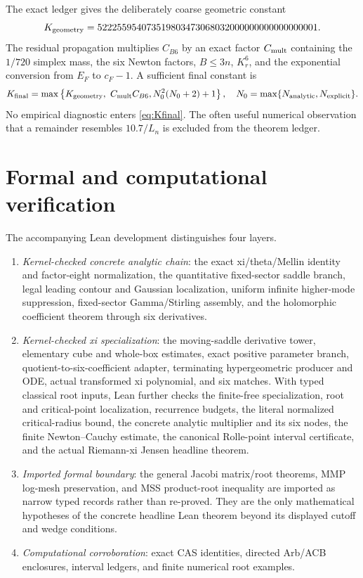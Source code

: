 \documentclass[12pt]{article}
\begin{document}
The exact ledger gives the deliberately coarse geometric constant
\begin{equation}\label{eq:Kgeometry}
 K_{\rm geometry}=
 522255954073519803473068032000000000000000001.
\end{equation}
The residual propagation multiplies $C_{B6}$ by an exact factor
$C_{\rm mult}$ containing the $1/720$ simplex mass, the six Newton factors,
$B\le3n$, $K_r^6$, and the exponential conversion from $E_F$ to $c_F-1$.
A sufficient final constant is
\begin{equation}\label{eq:Kfinal}
 K_{\rm final}=\max\left\{
 K_{\rm geometry},\ C_{\rm mult}C_{B6},\\
 N_0^2(N_0+2)+1\right\},
\quad N_0=\max\{N_{\rm analytic},N_{\rm explicit}\}.
\end{equation}
No empirical diagnostic enters \eqref{eq:Kfinal}.  The often useful numerical
observation that a remainder resembles $10.7/L_n$ is excluded from the
theorem ledger.

\section{Formal and computational verification}\label{sec:verification}

The accompanying Lean development distinguishes four layers.
\begin{enumerate}
\item \emph{Kernel-checked concrete analytic chain}: the exact
xi/theta/Mellin identity and factor-eight normalization, the quantitative
fixed-sector saddle branch, legal leading contour and Gaussian localization,
uniform infinite higher-mode suppression, fixed-sector Gamma/Stirling
assembly, and the holomorphic coefficient theorem through six derivatives.
\item \emph{Kernel-checked xi specialization}: the moving-saddle derivative
tower, elementary cube and whole-box estimates, exact positive parameter
branch, quotient-to-six-coefficient adapter, terminating hypergeometric
producer and ODE, actual transformed xi polynomial, and six matches.  With
typed classical root inputs, Lean further checks the finite-free
specialization, root and critical-point localization, recurrence budgets,
the literal normalized critical-radius bound, the concrete analytic
multiplier and its six nodes, the finite Newton--Cauchy estimate, the
canonical Rolle-point interval certificate, and the actual Riemann-xi Jensen
headline theorem.
\item \emph{Imported formal boundary}: the general Jacobi matrix/root
theorems, MMP log-mesh preservation, and MSS product-root inequality are
imported as narrow typed records rather than re-proved.  They are the only
mathematical hypotheses of the concrete headline Lean theorem beyond its
displayed cutoff and wedge conditions.
\item \emph{Computational corroboration}: exact CAS identities, directed
Arb/ACB enclosures, interval ledgers, and finite numerical root examples.
\end{enumerate}
\end{document}

